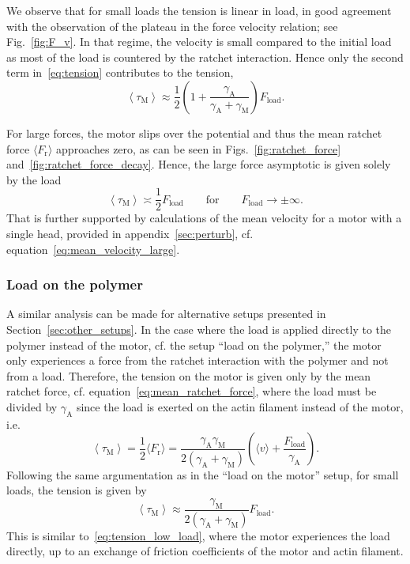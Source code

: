 \documentclass[aps,pre,twocolumn,showpacs,showkeys,superscriptaddress,floatfix]{revtex4-1}
\begin{document}
We observe that for small loads the tension is linear in load, in good agreement with the observation of the plateau in the force velocity relation;
see Fig.~\ref{fig:F_v}.
In that regime, the velocity is small compared to the initial load as most of the load is countered by the ratchet interaction. 
Hence only the second term in~\eqref{eq:tension} contributes to the tension, 
\begin{equation}
\left\langle \tau_\text{M} \right\rangle
\approx 
\frac{1}{2}
\left(1 + \frac{\gamma_\text{A}}{\gamma_\text{A}+\gamma_\text{M}} \right) F_\text{load}.
\label{eq:tension_low_load} 
\end{equation}

For large forces, the motor slips over the potential and thus the mean ratchet force $\langle F_\text{r}\rangle$ approaches zero,
as can be seen in Figs.~\ref{fig:ratchet_force} and~\ref{fig:ratchet_force_decay}.
Hence, the large force asymptotic is given solely by the load
\begin{equation}
\left\langle \tau_\text{M} \right\rangle
\asymp \frac{1}{2} F_\text{load} 
\qquad \text{for} \qquad F_\text{load} \to \pm \infty. 
\label{eq:tension_large_load}
\end{equation}
That is further supported by calculations of the mean velocity for a motor with a single head, provided in appendix~\ref{sec:perturb}, cf. equation~\eqref{eq:mean_velocity_large}.


\subsubsection{Load on the polymer}
A similar analysis can be made for alternative setups presented in Section~\ref{sec:other_setups}. 
In the case where the load is applied directly to the polymer instead of the motor, cf. the setup ``load on the polymer,'' 
the motor only experiences a force from the ratchet interaction with the polymer and not from a load. 
Therefore, the tension on the motor is given only by the mean ratchet force,  
cf. equation~\eqref{eq:mean_ratchet_force},  
where the load must be divided by $\gamma_\text{A}$ since the load is exerted on the actin filament instead of the motor,
i.e.
\begin{equation}
\left\langle \tau_\text{M} \right\rangle 
= \frac{1}{2} \langle F_\text{r} \rangle 
= \frac{\gamma_\text{A}\gamma_\text{M}}{2 \left( \gamma_\text{A} + \gamma_\text{M} \right) } \left(\langle v \rangle + \frac{F_\text{load}}{\gamma_\text{A}}\right) . 
\label{eq:tension_load_on_polymer}
\end{equation}
Following the same argumentation as in the ``load on the motor'' setup, for small loads, the tension is given by
\begin{equation}
\left\langle \tau_\text{M} \right\rangle
\approx \frac{\gamma_\text{M}}{ 2 \left( \gamma_\text{A}+\gamma_\text{M} \right) } F_\text{load}.
\label{eq:tension_low_load_on_polymer}
\end{equation}
This is similar to~\eqref{eq:tension_low_load}, where the motor experiences the load directly, up to an exchange of friction coefficients of the motor and actin filament. 
\end{document}
